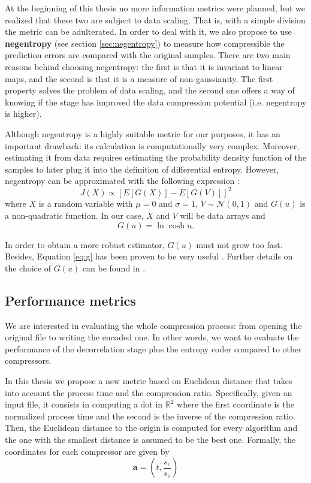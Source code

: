 At the beginning of this thesis no more information metrics were planned, but we realized that these two are subject to data scaling. That is, with a simple division the metric can be adulterated. In order to deal with it, we also propose to use \textbf{negentropy} (see section \ref{sec:negentropy}) to measure how compressible the prediction errors are compared with the original samples. There are two main reasons behind choosing negentropy: the first is that it is invariant to linear maps, and the second is that it is a measure of non-gaussianity. The first property solves the problem of data scaling, and the second one offers a way of knowing if the stage has improved the data compression potential (i.e. negentropy is higher).

Although negentropy is a highly suitable metric for our purposes, it has an important drawback: its calculation is computationally very complex. Moreover, estimating it from data requires estimating the probability density function of the samples to later plug it into the definition of differential entropy. However, negentropy can be approximated with the following expression \parencite{HYVARINEN2000411}:
\begin{equation} \label{eq:negentropy_approx}
J(X) \propto \left[E[G(X)] - E[G(V)]\right]^2
\end{equation}
where $X$ is a random variable with $\mu = 0$ and $\sigma = 1$, $V \sim \mathscr{N}(0,1)$ and $G(u)$ is a non-quadratic function. In our case, $X$ and $V$ will be data arrays and
\begin{equation} \label{eq:g}
G(u) = \ln \cosh u.
\end{equation}

In order to obtain a more robust estimator, $G(u)$ must not grow too fast. Besides, Equation \ref{eq:g} has been proven to be very useful \parencite{HYVARINEN2000411}. Further details on the choice of $G(u)$ can be found in \parencite{NIPS1997_6d9c547c}. 

\subsection{Performance metrics} \label{sec:euclidean}
We are interested in evaluating the whole compression process: from opening the original file to writing the encoded one. In other words, we want to evaluate the performance of the decorrelation stage plus the entropy coder compared to other compressors.

In this thesis we propose a new metric based on Euclidean distance that takes into account the process time and the compression ratio. Specifically, given an input file, it consists in computing a dot in $\mathbb{R}^2$ where the first coordinate is the normalized process time and the second is the inverse of the compression ratio. Then, the Euclidean distance to the origin is computed for every algorithm and the one with the smallest distance is assumed to be the best one. Formally, the coordinates for each compressor are given by
\begin{equation} \label{eq:dot_comp}
\mathbf{a} = \left(t, \frac{s_c}{s_o}\right)
\end{equation}

